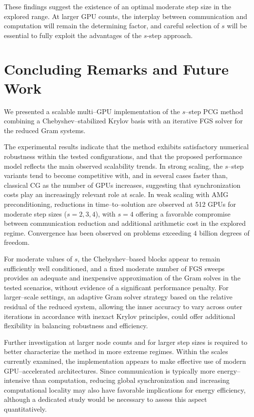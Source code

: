 \documentclass[pdflatex,sn-mathphys-num]{sn-jnl}%
\begin{document}
These findings suggest the existence of an optimal moderate step
size in the explored range. At larger GPU counts, the interplay
between communication and computation will remain the determining
factor, and careful selection of $s$ will be essential to fully
exploit the advantages of the $s$-step approach.

\section{Concluding Remarks and Future Work}
\label{sec:conc}

We presented a scalable multi--GPU implementation of the $s$--step PCG method combining a Chebyshev--stabilized Krylov basis with an iterative FGS solver for the reduced Gram systems.

The experimental results indicate that the method exhibits satisfactory numerical robustness within the tested configurations, and that the proposed performance model reflects the main observed scalability trends. In strong scaling, the $s$--step variants tend to become competitive with, and in several cases faster than, classical CG as the number of GPUs increases, suggesting that synchronization costs play an increasingly relevant role at scale. In weak scaling with AMG preconditioning, reductions in time--to--solution are observed at 512 GPUs for moderate step sizes ($s=2,3,4$), with $s=4$ offering a favorable compromise between communication reduction and additional arithmetic cost in the explored regime. Convergence has been observed on problems exceeding $4$ billion degrees of freedom.

For moderate values of $s$, the Chebyshev--based blocks appear to remain sufficiently well conditioned, and a fixed moderate number of FGS sweeps provides an adequate and inexpensive approximation of the Gram solves in the tested scenarios, without evidence of a significant performance penalty. For larger--scale settings, an adaptive Gram solver strategy based on the relative residual of the reduced system, allowing the inner accuracy to vary across outer iterations in accordance with inexact Krylov principles, could offer additional flexibility in balancing robustness and efficiency.

Further investigation at larger node counts and for larger step sizes is required to better characterize the method in more extreme regimes. Within the scales currently examined, the implementation appears to make effective use of modern GPU--accelerated architectures. Since communication is typically more energy--intensive than computation, reducing global synchronization and increasing computational locality may also have favorable implications for energy efficiency, although a dedicated study would be necessary to assess this aspect quantitatively.
\end{document}
